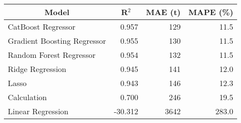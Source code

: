 
\begin{tabular}[t]{lrrr}
\toprule
\multicolumn{1}{c}{Model} & \multicolumn{1}{c}{R$^2$} & \multicolumn{1}{c}{MAE (t)} & \multicolumn{1}{c}{MAPE (\%)}\\
\midrule
CatBoost Regressor & 0.957 & 129 & 11.5\\
Gradient Boosting Regressor & 0.955 & 130 & 11.5\\
Random Forest Regressor & 0.954 & 132 & 11.5\\
Ridge Regression & 0.945 & 141 & 12.0\\
Lasso & 0.943 & 146 & 12.3\\
Calculation & 0.700 & 246 & 19.5\\
Linear Regression & -30.312 & 3642 & 283.0\\
\bottomrule
\end{tabular}
